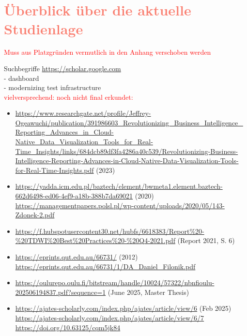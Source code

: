 \chapter{\textcolor{Salmon}{Überblick über die aktuelle Studienlage}}
\label{ch:SdF:sec:Studienlage}

\textcolor{red}{Muss aus Platzgründen vermutlich in den Anhang verschoben werden}

\noindent
Suchbegriffe \url{https://scholar.google.com}\\
- dashboard\\
- modernizing test infrastructure\\

\noindent
\textcolor{red}{vielversprechend: noch nicht final erkundet:}
\begin{itemize}
    \item \url{https://www.researchgate.net/profile/Jeffrey-Ogeawuchi/publication/391986603_Revolutionizing_Business_Intelligence_Reporting_Advances_in_Cloud-Native_Data_Visualization_Tools_for_Real-Time_Insights/links/684dcb89df3fa4286a40c539/Revolutionizing-Business-Intelligence-Reporting-Advances-in-Cloud-Native-Data-Visualization-Tools-for-Real-Time-Insights.pdf} (2023)
    \item \url{https://yadda.icm.edu.pl/baztech/element/bwmeta1.element.baztech-662d6498-ed06-4ef9-a18b-388b7da69021} (2020)\\
          \url{https://managementpapers.polsl.pl/wp-content/uploads/2020/05/143-Zdonek-2.pdf}
    \item \url{https://f.hubspotusercontent30.net/hubfs/6618383/Report%20-%20TDWI%20Best%20Practices%20-%20Q4-2021.pdf} (Report 2021, S. 6)
    \item \url{https://eprints.qut.edu.au/66731/} (2012)\\
          \url{https://eprints.qut.edu.au/66731/1/DA_Daniel_Filonik.pdf}
    \item \url{https://oulurepo.oulu.fi/bitstream/handle/10024/57322/nbnfioulu-202506194837.pdf?sequence=1} (June 2025, Master Thesis)
    \item \url{https://ajates-scholarly.com/index.php/ajates/article/view/6} (Feb 2025)
          \url{https://ajates-scholarly.com/index.php/ajates/article/view/6/7}
          \url{https://doi.org/10.63125/cqm5jk84}
\end{itemize}

